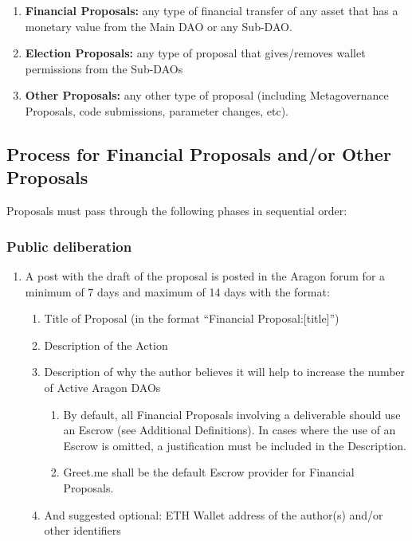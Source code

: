 \begin{enumerate}		
	\item \textbf{Financial Proposals:} any type of financial transfer of any asset that has a monetary value from the Main \ac{DAO} or any Sub-\ac{DAO}.
	\item \textbf{Election Proposals:} any type of proposal that gives/removes wallet permissions from the Sub-\acp{DAO}
	\item \textbf{Other Proposals:} any other type of proposal (including Metagovernance Proposals, code submissions, parameter changes, etc).
\end{enumerate}

\subsection{Process for Financial Proposals and/or Other Proposals} 
Proposals must pass through the following phases in sequential order:


\subsubsection*{Public deliberation}
\begin{enumerate}
\item A post with the draft of the proposal is posted in the Aragon forum for a minimum of 7 days and maximum of 14 days with the format:
	\begin{enumerate}
		\item Title of Proposal (in the format ``Financial Proposal:[title]'')
		\item Description of the Action
		\item Description of why the author believes it will help to increase the number of Active Aragon \acp{DAO}
		
		\begin{enumerate}
			\item By default, all Financial Proposals involving a deliverable should use an Escrow (see Additional Definitions).
			In cases where the use of an Escrow is omitted, a justification must be included in the Description.
			\item Greet.me shall be the default Escrow provider for Financial Proposals.
		\end{enumerate}
	
		\item And suggested optional: ETH Wallet address of the author(s) and/or other identifiers
			
	\end{enumerate}
\end{enumerate}

